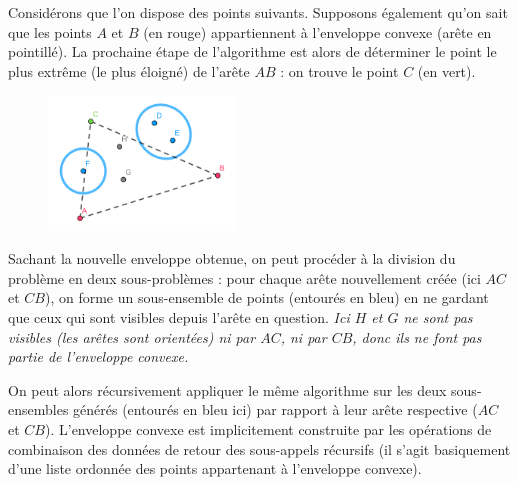 \documentclass[]{article}
\begin{document}
Considérons que l'on dispose des points suivants. Supposons également qu'on sait que les points $A$ et $B$ (en rouge) appartiennent à l'enveloppe convexe (arête en pointillé). La prochaine étape de l'algorithme est alors de déterminer le point le plus extrême (le plus éloigné) de l'arête $AB$ : on trouve le point $C$ (en vert).

\begin{figure}[H]
	\begin{center}
		\includegraphics[width=5cm]{qh2d/geogebra-export4.png}
	\end{center}
\end{figure}

Sachant la nouvelle enveloppe obtenue, on peut procéder à la division du problème en deux sous-problèmes : pour chaque arête nouvellement créée (ici $AC$ et $CB$), on forme un sous-ensemble de points (entourés en bleu) en ne gardant que ceux qui sont visibles depuis l'arête en question. \emph{Ici $H$ et $G$ ne sont pas visibles (les arêtes sont orientées) ni par $AC$, ni par $CB$, donc ils ne font pas partie de l'enveloppe convexe.}

On peut alors récursivement appliquer le même algorithme sur les deux sous-ensembles générés (entourés en bleu ici) par rapport à leur arête respective ($AC$ et $CB$). L'enveloppe convexe est implicitement construite par les opérations de combinaison des données de retour des sous-appels récursifs (il s'agit basiquement d'une liste ordonnée des points appartenant à l'enveloppe convexe).


\end{document}
